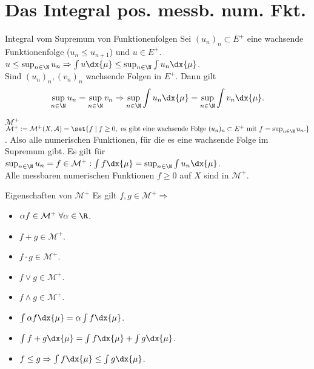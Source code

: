 \section*{Das Integral pos. messb. num. Fkt.}

\begin{karte}{Integral vom Supremum von Funktionenfolgen}
	Sei \( (u_n)_n \subset E^+ \) eine wachsende Funktionenfolge 
	(\(u_n \leq u_{n+1}\)) und \(u \in E^+\).\\
	\( u \leq \sup_{n\in\N} u_n \Rightarrow \int u \dx{\mu} 
	\leq \sup_{n\in\N} \int u_n \dx{\mu} \).\\
	Sind \( (u_n)_n, (v_n)_n \) wachsende Folgen in \(E^+\). Dann gilt 
	\[ \sup_{n\in\N} u_n = \sup_{n\in\N} v_n \Rightarrow 
	\sup_{n\in\N} \int u_n \dx{\mu} = \sup_{n\in\N} \int v_n \dx{\mu}. \]
\end{karte}

\begin{karte}{\( \mathcal{M}^+ \)}
	\( \mathcal{M}^+ := \mathcal{M}^+(X, \mathcal{A}) 
	= \set{f \;|\; f \geq 0, \text{ es gibt eine wachsende Folge } (u_n)_n \subset E^+ 
	\text{ mit } f = \sup_{n\in\N} u_n. } \). Also alle numerischen Funktionen, für die es eine wachsende Folge im Supremum gibt.
	Es gilt für \( \sup_{n\in\N} u_n = f\in \mathcal{M}^+: \int f \dx{\mu} = \sup_{n\in\N} \int u_n \dx{\mu} \).\\
	Alle messbaren numerischen Funktionen \( f \geq 0 \) auf \(X\) sind in \( \mathcal{M}^+ \).
\end{karte}

\begin{karte}{Eigenschaften von \( \mathcal{M}^+ \)}
	Es gilt \( f,g \in \mathcal{M}^+ \Rightarrow \)
	\begin{itemize}
		\item \( \alpha f \in \mathcal{M}^+ \;\forall \alpha \in\R \).
		\item \( f + g \in \mathcal{M}^+ \).
		\item \( f \cdot g \in \mathcal{M}^+ \).
		\item \( f \vee g \in \mathcal{M}^+ \).
		\item \( f \wedge g \in \mathcal{M}^+ \).
		\item \( \int \alpha f \dx{\mu} 
		= \alpha \int f \dx{\mu} \).
		\item \( \int f+g \dx{\mu} 
		= \int f \dx{\mu} + \int g \dx{\mu} \).
		\item \( f \leq g \Rightarrow 
		\int f \dx{\mu} \leq \int g\dx{\mu} \).
	\end{itemize}
\end{karte}

